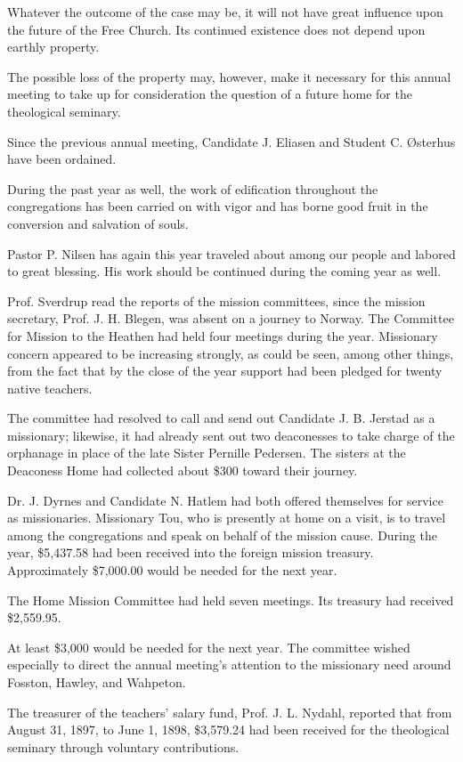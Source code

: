 Whatever the outcome of the case may be, it will not have great influence upon the future of the Free Church. Its continued existence does not depend upon earthly property.

The possible loss of the property may, however, make it necessary for this annual meeting to take up for consideration the question of a future home for the theological seminary.

Since the previous annual meeting, Candidate J. Eliasen and Student C. Østerhus have been ordained.

During the past year as well, the work of edification throughout the congregations has been carried on with vigor and has borne good fruit in the conversion and salvation of souls.

Pastor P. Nilsen has again this year traveled about among our people and labored to great blessing. His work should be continued during the coming year as well.

Prof. Sverdrup read the reports of the mission committees, since the mission secretary, Prof. J. H. Blegen, was absent on a journey to Norway. The Committee for Mission to the Heathen had held four meetings during the year. Missionary concern appeared to be increasing strongly, as could be seen, among other things, from the fact that by the close of the year support had been pledged for twenty native teachers.

The committee had resolved to call and send out Candidate J. B. Jerstad as a missionary; likewise, it had already sent out two deaconesses to take charge of the orphanage in place of the late Sister Pernille Pedersen. The sisters at the Deaconess Home had collected about \$300 toward their journey.

Dr. J. Dyrnes and Candidate N. Hatlem had both offered themselves for service as missionaries. Missionary Tou, who is presently at home on a visit, is to travel among the congregations and speak on behalf of the mission cause. During the year, \$5,437.58 had been received into the foreign mission treasury. Approximately \$7,000.00 would be needed for the next year.

The Home Mission Committee had held seven meetings. Its treasury had received \$2,559.95.

At least \$3,000 would be needed for the next year. The committee wished especially to direct the annual meeting’s attention to the missionary need around Fosston, Hawley, and Wahpeton.

The treasurer of the teachers’ salary fund, Prof. J. L. Nydahl, reported that from August 31, 1897, to June 1, 1898, \$3,579.24 had been received for the theological seminary through voluntary contributions.

